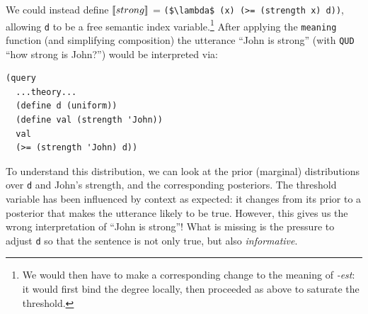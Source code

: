 \documentclass[12pt]{article}
\newcommand{\llbracket}{\ensuremath{\left [\!\left [}}%
\newcommand{\rrbracket}{\ensuremath{\right ]\!\right ]}}
\providecommand{\sv}[1]{\ensuremath{\llbracket #1 \rrbracket}}
\begin{document}
We could instead define \sv{strong} = \lstinline[mathescape]{($\lambda$ (x) (>= (strength x) d))}, allowing \lstinline{d} to be a free semantic index variable.\footnote{We would then have to make a corresponding change
to the meaning of \emph{-est}: it would first bind the degree locally, then proceeded as above to saturate the threshold.}
 After applying the \lstinline{meaning} function (and simplifying composition) the utterance ``John is strong'' (with \lstinline{QUD} ``how strong is John?'') would be interpreted via:
\begin{lstlisting}
(query
  ...theory...
  (define d (uniform))
  (define val (strength 'John))
  val
  (>= (strength 'John) d))
\end{lstlisting}
To understand this distribution, we can look at the prior (marginal) distributions over \lstinline{d} and John's strength, and the corresponding posteriors.
The threshold variable has been influenced by context as expected: it changes from its prior to a posterior that makes the utterance likely to be true. However, this gives us the wrong interpretation of ``John is strong''! What is missing is the pressure to adjust \lstinline{d} so that the sentence is not only true, but also \emph{informative}. 
\end{document}
